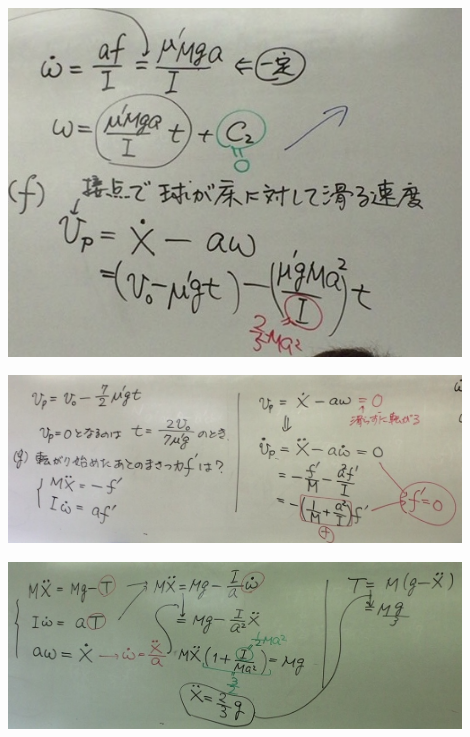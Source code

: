 \documentclass{jsarticle}
\begin{document}
	\begin{center}
		\includegraphics[width=12cm]{5_27_7.JPG}
	\end{center}
	\begin{center}
		\includegraphics[width=12cm]{5_27_8.JPG}
	\end{center}
	\begin{center}
		\includegraphics[width=12cm]{5_27_9.JPG}
	\end{center}
\end{document}
